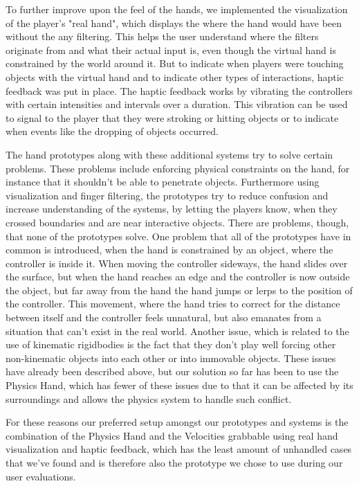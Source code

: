 To further improve upon the feel of the hands, we implemented the visualization of the player's "real hand", which displays the where the hand would have been without the any filtering. This helps the user understand where the filters originate from and what their actual input is, even though the virtual hand is constrained by the world around it. But to indicate when players were touching objects with the virtual hand and to indicate other types of interactions, haptic feedback was put in place. The haptic feedback works by vibrating the controllers with certain intensities and intervals over a duration. This vibration can be used to signal to the player that they were stroking or hitting objects or to indicate when events like the dropping of objects occurred.

The hand prototypes along with these additional systems try to solve certain problems. These problems include enforcing physical constraints on the hand, for instance that it shouldn't be able to penetrate objects. Furthermore using visualization and finger filtering, the prototypes try to reduce confusion and increase understanding of the systems, by letting the players know, when they crossed boundaries and are near interactive objects. There are problems, though, that none of the prototypes solve. One problem that all of the prototypes have in common is introduced, when the hand is constrained by an object, where the controller is inside it. When moving the controller sideways, the hand slides over the surface, but when the hand reaches an edge and the controller is now outside the object, but far away from the hand the hand jumps or lerps to the position of the controller. This movement, where the hand tries to correct for the distance between itself and the controller feels unnatural, but also emanates from a situation that can't exist in the real world. Another issue, which is related to the use of kinematic rigidbodies is the fact that they don't play well forcing other non-kinematic objects into each other or into immovable objects. These issues have already been described above, but our solution so far has been to use the Physics Hand, which has fewer of these issues due to that it can be affected by its surroundings and allows the physics system to handle such conflict.

For these reasons our preferred setup amongst our prototypes and systems is the combination of the Physics Hand and the Velocities grabbable using real hand visualization and haptic feedback, which has the least amount of unhandled cases that we've found and is therefore also the prototype we chose to use during our user evaluations.